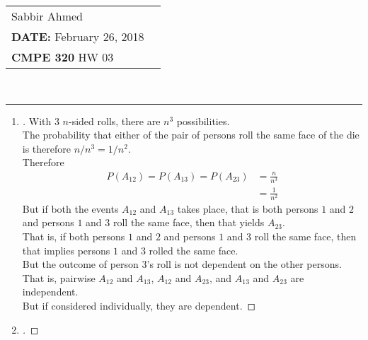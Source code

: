 \documentclass[paper=usletter, fontsize=12pt]{article}
\newcommand{\documentinfo}[5]{
    \begin{centering}
        \parbox{2in}{
        \begin{spacing}{1}
            \begin{flushleft}
                \begin{tabular}{l l}
                    #1 \\
                    #2 \\
                    #3 \\
                \end{tabular}\\
                \rule{\textwidth}{1pt}
            \end{flushleft}
        \end{spacing}
        }
    \end{centering}
}
\begin{document}
    \documentinfo{Sabbir Ahmed}{\textbf{DATE:} February 26, 2018}{\textbf{CMPE 320} HW 03}
    \vspace{-0.2in}

    \begin{enumerate}

        \item
        \begin{proof}[\unskip\nopunct]
            With 3 $n$-sided rolls, there are $n^3$ possibilities. \\
            The probability that either of the pair of persons roll the same
            face of the die is therefore $n/n^3=1/n^2$. \\
            Therefore
            \begin{align*}
                P(A_{12}) = P(A_{13}) = P(A_{23}) & = \frac{n}{n^3} \\
                & = \frac{1}{n^2}
            \end{align*}
            But if both the events $A_{12}$ and $A_{13}$ takes place, that is
            both persons $1$ and $2$ and persons $1$ and $3$ roll the same
            face, then that yields $A_{23}$. \\
            That is, if both persons $1$ and $2$ and persons $1$ and $3$ roll
            the same face, then that implies persons $1$ and $3$ rolled the
            same face.\\
            But the outcome of person $3$'s roll is not dependent on the other
            persons.\\
            That is, pairwise $A_{12}$ and $A_{13}$, $A_{12}$ and $A_{23}$, and
            $A_{13}$ and $A_{23}$ are independent.\\
            But if considered individually, they are dependent. \qedhere
        \end{proof}
        \vspace{0.2in}

        \item
        \begin{proof}[\unskip\nopunct]


\end{proof}
\end{enumerate}
\end{document}
